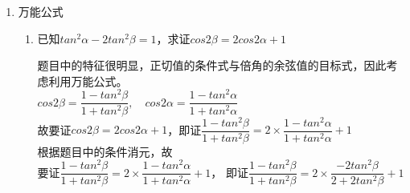 \begin{enumerate}
\begin{enumerate}
\begin{jieda}
        \end{jieda}
        \item 已知$\alpha \in (-\dfrac{\pi}{4}, \dfrac{\pi}{4}), \beta \in (\dfrac{\pi}{4}, \dfrac{3\pi}{4})$，且$sin(\dfrac{3\pi}{4} + \alpha) = \dfrac{5}{13}, cos(\dfrac{\pi}{4} - \beta) = \dfrac{3}{5}$，求$sin(\dfrac{\alpha - \beta}{2})$
        \begin{jieda}
            观察可知应使用诱导公式后利用和角公式可以出$\alpha - \beta$的三角函数值. \\
            $sin(\dfrac{3\pi}{4} + \alpha) = \dfrac{5}{13}$即$cos(\dfrac{\pi}{4} + \alpha) = \dfrac{5}{13}$，根据$\alpha \in (-\dfrac{\pi}{4}, \dfrac{\pi}{4})$可知$sin(\dfrac{\pi}{4} + \alpha) = \dfrac{12}{13}$ \\
            根据$\beta \in (\dfrac{\pi}{4}, \dfrac{3\pi}{4}), cos(\dfrac{\pi}{4} - \beta) = \dfrac{3}{5}$可知$sin(\dfrac{\pi}{4} - \beta) = -\dfrac{4}{5}$ \\
            故$cos(\alpha - \beta) = sin(\dfrac{\pi}{2} + \alpha - \beta) = sin(\dfrac{\pi}{4} + \alpha) cos(\dfrac{\pi}{4} - \beta) + cos(\dfrac{\pi}{4} + \alpha) sin(\dfrac{\pi}{4} - \beta) = \dfrac{16}{65}$ \\
            根据$\alpha \in (-\dfrac{\pi}{4}, \dfrac{\pi}{4}), \beta \in (\dfrac{\pi}{4}, \dfrac{3\pi}{4})$可知$\alpha - \beta \in (-\pi, 0)$，故$sin(\dfrac{\alpha - \beta}{2}) = -\sqrt{\dfrac{1-cos(\alpha - \beta)}{2}} = -\dfrac{7\sqrt{130}}{130}$
        \end{jieda}
    \end{enumerate}
    \item 万能公式
    \begin{enumerate}
        \item 已知$tan^2\alpha - 2tan^2\beta = 1$，求证$cos2\beta = 2cos2\alpha + 1$
        \begin{jieda}
            题目中的特征很明显，正切值的条件式与倍角的余弦值的目标式，因此考虑利用万能公式。\\
            $cos2\beta = \dfrac{1-tan^2\beta}{1+tan^2\beta},\quad cos2\alpha = \dfrac{1-tan^2\alpha}{1+tan^2\alpha}$\\
            故要证$cos2\beta = 2cos2\alpha + 1$，即证$\dfrac{1-tan^2\beta}{1+tan^2\beta} = 2 \times \dfrac{1-tan^2\alpha}{1+tan^2\alpha} + 1$ \\
            根据题目中的条件消元，故 \\
            要证$\dfrac{1-tan^2\beta}{1+tan^2\beta} = 2 \times \dfrac{1-tan^2\alpha}{1+tan^2\alpha} + 1$， 即证$\dfrac{1-tan^2\beta}{1+tan^2\beta} = 2 \times \dfrac{-2tan^2\beta}{2+2tan^2\beta} + 1$ \\

\end{jieda}
\end{enumerate}
\end{enumerate}
